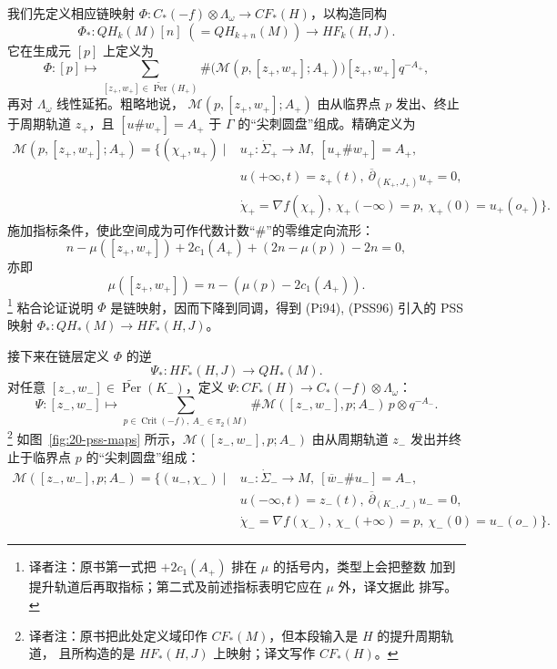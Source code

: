 我们先定义相应链映射
$\Phi:C_*(-f)\otimes\Lambda_\omega\to CF_*(H)$，以构造同构
\[
 \Phi_*:QH_k(M)[n]\;(=QH_{k+n}(M))\longrightarrow HF_k(H,J).
\]
它在生成元 $[p]$ 上定义为
\[
 \Phi:[p]\longmapsto
 \sum_{[z_+,w_+]\in\widetilde{\operatorname{Per}}(H_+)}
 \#\bigl(\mathcal M(p,[z_+,w_+];A_+)\bigr)[z_+,w_+]q^{-A_+},
\]
再对 $\Lambda_\omega$ 线性延拓。粗略地说，
$\mathcal M(p,[z_+,w_+];A_+)$ 由从临界点 $p$ 发出、终止于周期轨道 $z_+$，且
$[u\#w_+]=A_+$ 于 $\Gamma$ 的“尖刺圆盘”组成。精确定义为
\[
 \begin{aligned}
 \mathcal M(p,[z_+,w_+];A_+)=\{(\chi_+,u_+)\mid{}
 &u_+:\dot\Sigma_+\to M,\ [u_+\#w_+]=A_+,\\
 &u(+\infty,t)=z_+(t),\ \overline\partial_{(K_+,J_+)}u_+=0,\\
 &\dot\chi_+=\nabla f(\chi_+),\ \chi_+(-\infty)=p,
 \ \chi_+(0)=u_+(o_+)\}.
 \end{aligned}
\]
施加指标条件，使此空间成为可作代数计数“$\#$”的零维定向流形：
\[
 n-\mu([z_+,w_+])+2c_1(A_+)+(2n-\mu(p))-2n=0,
\]
亦即
\[
 \mu([z_+,w_+])=n-(\mu(p)-2c_1(A_+)).
\]
\footnote{译者注：原书第一式把 $+2c_1(A_+)$ 排在 $\mu$ 的括号内，类型上会把整数
加到提升轨道后再取指标；第二式及前述\personFredholm{}指标表明它应在 $\mu$ 外，译文据此
排写。}
粘合论证说明 $\Phi$ 是链映射，因而下降到同调，得到 (Pi94), (PSS96) 引入的 PSS
映射 $\Phi_*:QH_*(M)\to HF_*(H,J)$。

接下来在链层定义 $\Phi$ 的逆
\[
 \Psi_*:HF_*(H,J)\longrightarrow QH_*(M).
\]
对任意 $[z_-,w_-]\in\widetilde{\operatorname{Per}}(K_-)$，定义
$\Psi:CF_*(H)\to C_*(-f)\otimes\Lambda_\omega$：
\[
 \Psi:[z_-,w_-]\longmapsto
 \sum_{p\in\operatorname{Crit}(-f),\ A_-\in\pi_2(M)}
 \#\mathcal M([z_-,w_-],p;A_-)\,p\otimes q^{-A_-}.
\]
\footnote{译者注：原书把此处定义域印作 $CF_*(M)$，但本段输入是 $H$ 的提升周期轨道，
且所构造的是 $HF_*(H,J)$ 上映射；译文写作 $CF_*(H)$。}
如图~\ref{fig:20-pss-maps} 所示，$\mathcal M([z_-,w_-],p;A_-)$ 由从周期轨道
$z_-$ 发出并终止于临界点 $p$ 的“尖刺圆盘”组成：
\[
 \begin{aligned}
 \mathcal M([z_-,w_-],p;A_-)=\{(u_-,\chi_-)\mid{}
 &u_-:\dot\Sigma_-\to M,\ [\overline w_-\#u_-]=A_-,\\
 &u(-\infty,t)=z_-(t),\ \overline\partial_{(K_-,J_-)}u_-=0,\\
 &\dot\chi_-=\nabla f(\chi_-),\ \chi_-(+\infty)=p,
 \ \chi_-(0)=u_-(o_-)\}.
 \end{aligned}
\]

